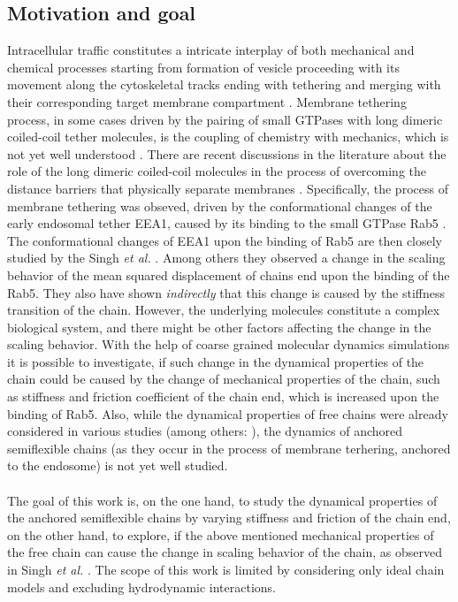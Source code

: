 \documentclass[
    paper=A4,pagesize=automedia,fontsize=12pt,
    BCOR=15mm,DIV=22,
    twoside,headinclude,footinclude=false,
    fleqn,             %
    bibliography=totocnumbered,          %
    listof=totoc,                %
    listof=flat,                 %
    cleardoublepage=empty      %
    numbers=endperiod
]{scrartcl}
\begin{document}
\subsection{Motivation and goal}
Intracellular traffic constitutes a intricate interplay of both mechanical 
and chemical processes starting from formation of vesicle proceeding with 
its movement along the cytoskeletal tracks ending with tethering and merging
with their corresponding target membrane compartment \cite{Singh:2022}.
Membrane tethering process, in some cases driven by the pairing of
small GTPases with long dimeric coiled-coil tether molecules, \cite{Singh:2022}  
is the coupling of chemistry with mechanics, which is not yet well 
understood \cite{Singh:2022}. There are recent discussions in the literature
about the role of the long dimeric coiled-coil molecules in the process
of overcoming the distance barriers that physically separate 
membranes \cite{Singh:2022}. Specifically, the process of membrane tethering was
obseved, driven by the conformational changes of the early endosomal
tether EEA1, caused by its binding to the small GTPase Rab5 \cite{Murray2016}.
The conformational changes of EEA1 upon the binding of Rab5 are then closely
studied by the Singh \emph{et al.} \cite{Singh:2022}. 
Among others they observed 
a change in the scaling behavior of the mean squared displacement of 
chains end upon the binding of the Rab5. They also have shown \emph{indirectly} 
that this change is caused by the stiffness transition of the chain.
However, the underlying molecules constitute a complex biological system, and
there might be other factors affecting the change in the scaling behavior.
With the help of coarse grained molecular dynamics simulations it is possible
to investigate, if such change in the dynamical properties of the chain could 
be caused by the change of mechanical properties of the chain, such as stiffness and 
friction coefficient of the chain end, 
which is increased upon the binding of Rab5. Also, while the dynamical
properties of free chains were already considered in various studies 
(among others: \cite{Singh:2022} \cite{Nikoubashman2016} 
\cite{Kremer_ChemPhys} \cite{Hinczewski_2009}), the dynamics of anchored
semiflexible chains
(as they occur in the process of membrane terhering, anchored to the endosome)
is not yet well studied. 
\\
\\
The goal of this work is, on the one hand, to study 
the dynamical properties of the anchored semiflexible chains by varying 
stiffness and 
friction of the chain end, on the other hand, to explore, if the above mentioned
mechanical properties of the free chain can cause the change in scaling behavior
of the chain, as observed in Singh \emph{et al.} \cite{Singh:2022}. The scope
of this work is limited by considering only ideal chain models and excluding
hydrodynamic interactions.
\end{document}

